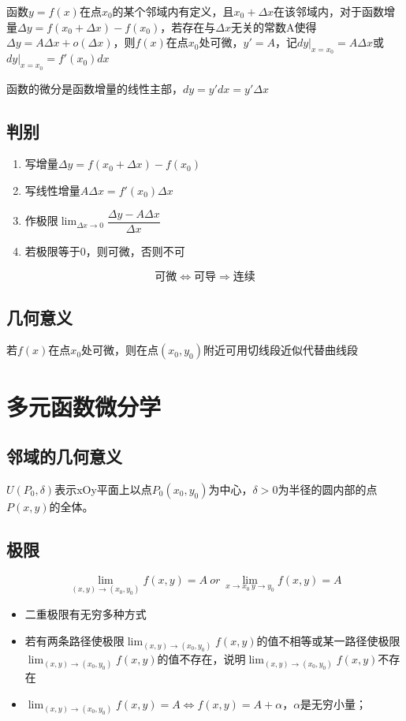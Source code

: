 函数\(y = f(x)\)在点\(x_0\)的某个邻域内有定义，且\(x_0 + \Delta x\)在该邻域内，对于函数增量\(\Delta y = f(x_0 + \Delta x) - f(x_0)\)，若存在与\(\Delta x\)无关的常数A使得\(\Delta y = A\Delta x + o(\Delta x)\)，则\(f(x)\)在点\(x_0\)处可微，\(y' = A\)，记\(dy|_{x = x_0} = A\Delta x\)或\(dy|_{x = x_0} = f'(x_0)dx\)

函数的微分是函数增量的线性主部，\(dy = y'dx = y'\Delta x\)


\subsection{判别}
\begin{enumerate}
    \item 写增量\(\Delta y = f(x_0 + \Delta x) - f(x_0)\)
    \item 写线性增量\(A\Delta x = f'(x_0)\Delta x\)
    \item 作极限\(\displaystyle \lim_{\Delta x \to 0}\dfrac{\Delta y - A\Delta x}{\Delta x}\)
    \item 若极限等于0，则可微，否则不可
\end{enumerate}
\[\text{可微} \Leftrightarrow \text{可导} \Rightarrow \text{连续}\]


\subsection{几何意义}

若\(f(x)\)在点\(x_0\)处可微，则在点\((x_0, y_0)\)附近可用切线段近似代替曲线段


\section{多元函数微分学}

\subsection{邻域的几何意义}
\(U(P_0, \delta)\)表示xOy平面上以点\(P_0(x_0, y_0)\)为中心，\(\delta > 0\)为半径的圆内部的点\(P(x, y)\)的全体。

\subsection{极限}
\[\lim_{(x, y) \to (x_0, y_0)}f(x, y) = A\ or\ \lim_{x\to x_0\ y \to y_0}f(x, y) = A\]

\begin{itemize}
    \item 二重极限有无穷多种方式
    \item 若有两条路径使极限\(\displaystyle\lim_{(x, y) \to (x_0, y_0)}f(x, y)\)的值不相等或某一路径使极限\(\displaystyle\lim_{(x, y) \to (x_0, y_0)}f(x, y)\)的值不存在，说明\(\displaystyle\lim_{(x, y) \to (x_0, y_0)}f(x, y)\)不存在
    \item \(\displaystyle\lim_{(x, y) \to (x_0, y_0)}f(x, y) = A \Leftrightarrow f(x, y) = A + \alpha\)，\(\alpha\)是无穷小量；
\end{itemize}


